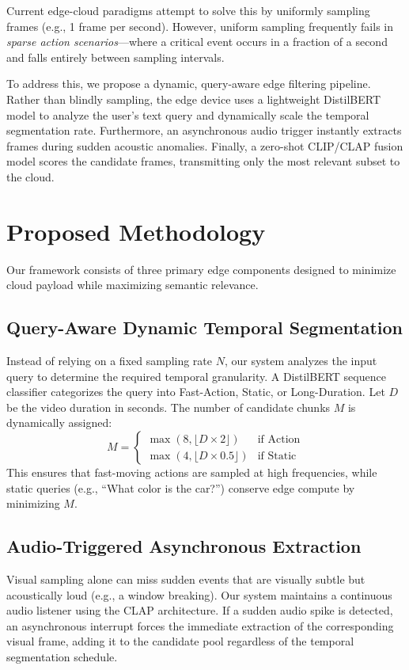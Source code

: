 \documentclass[10pt, conference, letterpaper]{IEEEtran}
\begin{document}
Current edge-cloud paradigms attempt to solve this by uniformly sampling frames (e.g., 1 frame per second). However, uniform sampling frequently fails in \textit{sparse action scenarios}---where a critical event occurs in a fraction of a second and falls entirely between sampling intervals.

To address this, we propose a dynamic, query-aware edge filtering pipeline. Rather than blindly sampling, the edge device uses a lightweight DistilBERT model to analyze the user's text query and dynamically scale the temporal segmentation rate. Furthermore, an asynchronous audio trigger instantly extracts frames during sudden acoustic anomalies. Finally, a zero-shot CLIP/CLAP fusion model scores the candidate frames, transmitting only the most relevant subset to the cloud.

\section{Proposed Methodology}
Our framework consists of three primary edge components designed to minimize cloud payload while maximizing semantic relevance.

\subsection{Query-Aware Dynamic Temporal Segmentation}
Instead of relying on a fixed sampling rate $N$, our system analyzes the input query to determine the required temporal granularity. 
A DistilBERT sequence classifier categorizes the query into Fast-Action, Static, or Long-Duration. 
Let $D$ be the video duration in seconds. The number of candidate chunks $M$ is dynamically assigned:
\begin{equation}
M = 
\begin{cases} 
\max(8, \lfloor D \times 2 \rfloor) & \text{if Action} \\
\max(4, \lfloor D \times 0.5 \rfloor) & \text{if Static}
\end{cases}
\end{equation}
This ensures that fast-moving actions are sampled at high frequencies, while static queries (e.g., ``What color is the car?'') conserve edge compute by minimizing $M$.

\subsection{Audio-Triggered Asynchronous Extraction}
Visual sampling alone can miss sudden events that are visually subtle but acoustically loud (e.g., a window breaking). Our system maintains a continuous audio listener using the CLAP architecture. If a sudden audio spike is detected, an asynchronous interrupt forces the immediate extraction of the corresponding visual frame, adding it to the candidate pool regardless of the temporal segmentation schedule.
\end{document}
